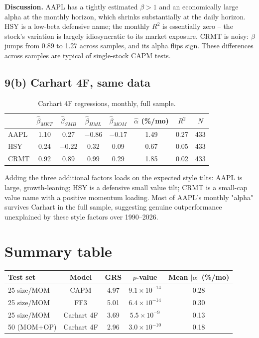 \documentclass[11pt,letterpaper]{article}
\begin{document}
\textbf{Discussion.} AAPL has a tightly estimated $\beta>1$ and an economically large
alpha at the monthly horizon, which shrinks substantially at the daily horizon. HSY is
a low-beta defensive name; the monthly $R^2$ is essentially zero -- the stock's variation
is largely idiosyncratic to its market exposure. CRMT is noisy: $\beta$ jumps from 0.89
to 1.27 across samples, and its alpha flips sign. These differences across samples are
typical of single-stock CAPM tests.

\subsection*{9(b) Carhart 4F, same data}

\begin{table}[h]
\centering
\caption{Carhart 4F regressions, monthly, full sample.}
\begin{tabular}{lccccccc}
\toprule
& $\hat\beta_{MKT}$ & $\hat\beta_{SMB}$ & $\hat\beta_{HML}$ & $\hat\beta_{MOM}$ &
$\hat\alpha$ (\%/mo) & $R^2$ & $N$ \\
\midrule
AAPL & 1.10 &  0.27 & $-0.86$ & $-0.17$ & 1.49 & 0.27 & 433 \\
HSY  & 0.24 & $-0.22$ &  0.32 &  0.09 & 0.67 & 0.05 & 433 \\
CRMT & 0.92 &  0.89 &  0.99 &  0.29 & 1.85 & 0.02 & 433 \\
\bottomrule
\end{tabular}
\end{table}

Adding the three additional factors loads on the expected style tilts: AAPL is large,
growth-leaning; HSY is a defensive small value tilt; CRMT is a small-cap value name with a
positive momentum loading. Most of AAPL's monthly "alpha" survives Carhart in the full
sample, suggesting genuine outperformance unexplained by these style factors over
1990--2026.

\section*{Summary table}

\begin{center}
\begin{tabular}{lcccc}
\toprule
Test set & Model & GRS & $p$-value & Mean $|\alpha|$ (\%/mo) \\
\midrule
25 size/MOM & CAPM       & 4.97 & $9.1\times 10^{-14}$ & 0.28 \\
25 size/MOM & FF3        & 5.01 & $6.4\times 10^{-14}$ & 0.30 \\
25 size/MOM & Carhart 4F & 3.69 & $5.5\times 10^{-9}$  & 0.13 \\
50 (MOM+OP) & Carhart 4F & 2.96 & $3.0\times 10^{-10}$ & 0.18 \\
\bottomrule
\end{tabular}
\end{center}
\end{document}
